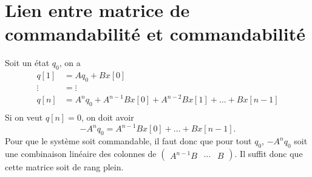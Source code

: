 \section{Lien entre matrice de commandabilité et commandabilité}
\label{ann:command}
Soit un état $q_0$, on a
\begin{align*}
  q[1] & = A q_0 + B x[0]\\
  \vdots & = \vdots\\
  q[n] & = A^nq_0 + A^{n-1}Bx[0] + A^{n-2}Bx[1] + \ldots + Bx[n-1]\\
\end{align*}
Si on veut $q[n] = 0$, on doit avoir
\[ -A^nq_0 = A^{n-1}Bx[0] + \ldots + Bx[n-1]. \]
Pour que le système soit commandable,
il faut donc que pour tout $q_0$, $-A^nq_0$ soit une combinaison
linéaire des colonnes de $\begin{pmatrix}A^{n-1}B & \cdots & B\end{pmatrix}$.
Il suffit donc %
que cette matrice soit de rang plein.


